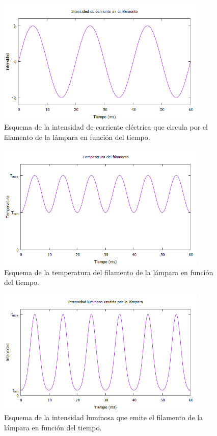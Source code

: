 \documentclass[12pt]{article}
\numberwithin{table}{section}
\numberwithin{figure}{section}
\numberwithin{equation}{section}
\begin{document}
\begin{figure}[!ht]
\begin{center}
\includegraphics[width=10cm]{P10Intensidadfilamento.png}
\caption{Esquema de la intensidad de corriente eléctrica que circula por el filamento de la lámpara en función del tiempo.}\label{P10intensidadfilamento}
\end{center}
\end{figure}
\begin{figure}[!ht]
\begin{center}
\includegraphics[width=10cm]{P10Temperatura.png}
\caption{Esquema de la temperatura del filamento de la lámpara en función del tiempo.}\label{P10temperatura}
\end{center}
\end{figure}
\begin{figure}[!ht]
\begin{center}
\includegraphics[width=10cm]{P10Intensidadluminosa.png}
\caption{Esquema de la intensidad luminosa que emite el filamento de la lámpara en función del tiempo.}\label{P10intensidadluminosa}
\end{center}
\end{figure}
\end{document}
